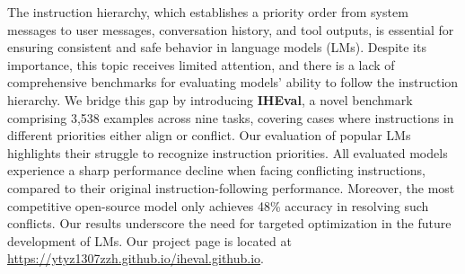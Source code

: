 The instruction hierarchy, which establishes a priority order from system messages to user messages, conversation history, and tool outputs, is essential for ensuring consistent and safe behavior in language models (LMs). Despite its importance, this topic receives limited attention, and there is a lack of comprehensive benchmarks for evaluating models' ability to follow the instruction hierarchy. We bridge this gap by introducing \textbf{IHEval}, a novel benchmark comprising 3,538 examples across nine tasks, covering cases where instructions in different priorities either align or conflict. Our evaluation of popular LMs highlights their struggle to recognize instruction priorities. All evaluated models experience a sharp performance decline when facing conflicting instructions, compared to their original instruction-following performance. Moreover, the most competitive open-source model only achieves 48\% accuracy in resolving such conflicts. Our results underscore the need for targeted optimization in the future development of LMs. Our project page is located at \url{https://ytyz1307zzh.github.io/iheval.github.io}.
